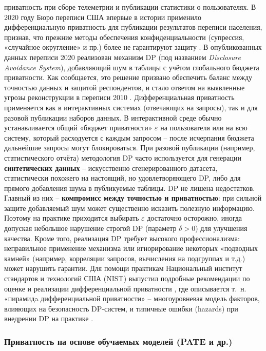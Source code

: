 приватность при сборе телеметрии и публикации статистики о пользователях. В 2020 году Бюро переписи США впервые в истории применило дифференциальную приватность для публикации результатов переписи населения, признав, что прежние методы обеспечения конфиденциальности (супрессия, «случайное округление» и пр.) более не гарантируют защиту \autocite{cornell-edu}. В опубликованных данных переписи 2020 реализован механизм DP (под названием \textit{Disclosure Avoidance System}), добавляющий шум в таблицы с учётом глобального бюджета приватности. Как сообщается, это решение призвано обеспечить баланс между точностью данных и защитой респондентов, и стало ответом на выявленные угрозы реконструкции в переписи 2010 \autocite{census-gov} \autocite{cornell-edu}. Дифференциальная приватность применяется как в интерактивных системах (отвечающих на запросы), так и для разовой публикации наборов данных. В интерактивной среде обычно устанавливается общий «бюджет приватности» $\varepsilon$ на пользователя или на всю систему, который расходуется с каждым запросом – после исчерпания бюджета дальнейшие запросы могут блокироваться. При разовой публикации (например, статистического отчёта) методология DP часто используется для генерации \textbf{синтетических данных} – искусственно сгенерированного датасета, статистически похожего на настоящий, но удовлетворяющего DP, либо для прямого добавления шума в публикуемые таблицы. DP не лишена недостатков. Главный из них – \textbf{компромисс между точностью и приватностью}: при сильной защите добавляемый шум может существенно исказить полезную информацию. Поэтому на практике приходится выбирать $\varepsilon$ достаточно осторожно, иногда допуская небольшое нарушение строгой DP (параметр $\delta>0$) для улучшения качества. Кроме того, реализация DP требует высокого профессионализма: неправильное применение механизма или игнорирование некоторых «подводных камней» (например, корреляции запросов, вычисления на подгруппах и т.д.) может нарушить гарантии. Для помощи практикам Национальный институт стандартов и технологий США (NIST) выпустил подробные рекомендации по оценке и реализации дифференциальной приватности \autocite{nvlpubs-nist-gov}
, где описывается т. н. «пирамидa дифференциальной приватности» – многоуровневая модель факторов, влияющих на безопасность DP-систем, и типичные ошибки (hazards) при внедрении DP на практике \autocite{nvlpubs-nist-gov}. \subsubsection{Приватность на основе обучаемых моделей (PATE и др.)}
